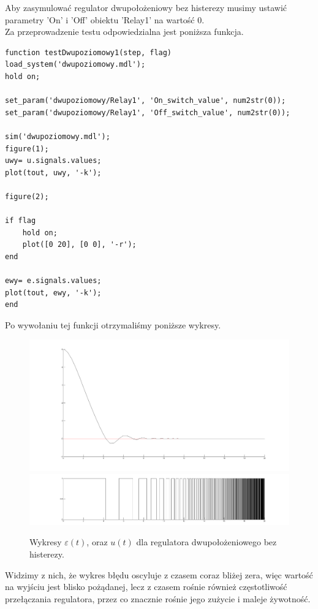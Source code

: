 \documentclass[a4paper,10pt]{article}
\begin{document}
Aby zasymulować regulator dwupołożeniowy bez histerezy musimy ustawić parametry 'On' i 'Off' obiektu 'Relay1' na wartość 0. \\
Za przeprowadzenie testu odpowiedzialna jest poniższa funkcja.

\begin{lstlisting}[caption=Funkcja testująca regulator dwupołożeniowy bez histerezy.]
function testDwupoziomowy1(step, flag)
load_system('dwupoziomowy.mdl');
hold on;

set_param('dwupoziomowy/Relay1', 'On_switch_value', num2str(0));
set_param('dwupoziomowy/Relay1', 'Off_switch_value', num2str(0));

sim('dwupoziomowy.mdl');
figure(1);
uwy= u.signals.values;    
plot(tout, uwy, '-k');

figure(2);

if flag
    hold on;
    plot([0 20], [0 0], '-r');
end

ewy= e.signals.values;    
plot(tout, ewy, '-k');
end
\end{lstlisting}

Po wywołaniu tej funkcji otrzymaliśmy poniższe wykresy.

\begin{figure}[!h]
    \centering
	\includegraphics[width=120mm]{CW3-dwupolozeniowy-e-a0.png}
	\includegraphics[width=120mm]{CW3-dwupolozeniowy-u-a0.png}
	\caption{Wykresy $\varepsilon(t)$, oraz $u(t)$ dla regulatora dwupołożeniowego bez histerezy.}
    \label{fig:Rysunek}
\end{figure}

\newpage Widzimy z nich, że wykres błędu oscyluje z czasem coraz bliżej zera, więc wartość na wyjściu jest blisko pożądanej, lecz z czasem rośnie również częstotliwość przełączania regulatora, przez co znacznie rośnie jego zużycie i maleje żywotność.
\end{document}
